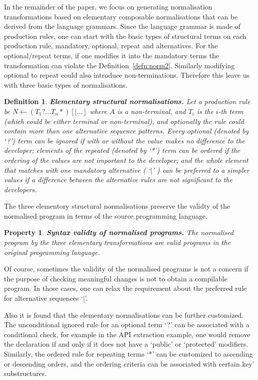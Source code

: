 \documentclass[10pt, conference, compsocconf]{IEEEtran}
\newtheorem{property}{Property}
\newtheorem{definition}{Definition}
\begin{document}
In the remainder of the paper, we focus on generating normalisation transformations based on elementary composable normalisations that can be derived from the language grammars. Since the language grammar is made of production rules,
one can start with the basic types of structural terms on each production rule, mandatory, optional, repeat and alternatives. For the optional/repeat terms, if one modifies it into the mandatory terms the transformation can violate the Definition~\ref{defn:norm2}. Similarly modifying optional to repeat could also introduce non-terminations. Therefore this leave us with three basic types of normalisations.
\begin{definition}
{\bf Elementary structural normalisations.\label{defn:norm3}} Let a production rule be $N \leftarrow (T_1? \ldots T_n*) [| \ldots] $ where $A$ is a non-terminal, and $T_i$ is the $i$-th term (which could be either terminal or non-terminal), and optionally the rule could contain more than one alternative sequence patterns. Every optional (denoted by `?') term can be {\em ignored} if with or without the value makes no difference to the developer; elements of the repeated (denoted by `*') term can be {\em ordered} if the ordering of the values are not important to the developer; and the whole element that matches with one mandatory alternative ( `$|$' )  can be {\em preferred} to a simpler values if a difference between the alternative rules are not significant to the developers.
\end{definition}

The three elementory structural normalisations preserve the validty of the normalised program in terms of the source programming language.
\begin{property}
{\bf Syntax validty of normalised programs.\label{defn:norm4}} The normalised program by the three elementary transformations are valid programs in the original programming language.
\end{property}

Of course, sometimes the validity of the normalised programs is not a concern if the purpose of checking meaningful changes is not to obtain a compilable program. In those cases, one can relax the requirement about the preferred rule for alternative sequences `$|$'. 

Also it is found that the elementary normalisations can be further customized. The unconditional ignored rule for an optional term `?' can be associated with a conditional check, for example in the API extraction example, one would remove the declaration if and only if it does not have a `public' or `protected' modifiers. Similarly, the ordered rule for repeating terms `*' can be customized to ascending or descending orders, and the ordering criteria can be associated with certain key' substructures.
\end{document}
